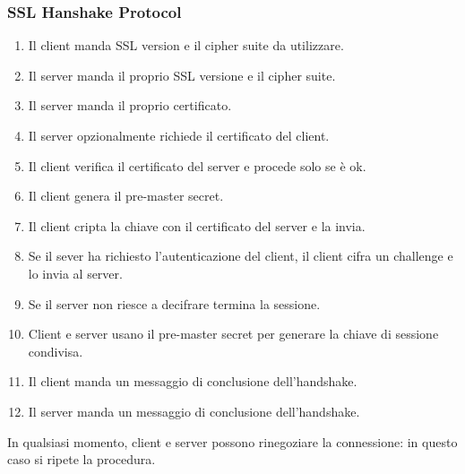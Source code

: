         \subsubsection{SSL Hanshake Protocol}
            \begin{enumerate}
                \item Il client manda SSL version e il cipher suite da utilizzare.
                \item Il server manda il proprio SSL versione e il cipher suite.
                \item Il server manda il proprio certificato.
                \item Il server opzionalmente richiede il certificato del client.
                \item Il client verifica il certificato del server e procede solo se è ok.
                \item Il client genera il pre-master secret.
                \item Il client cripta la chiave con il certificato del server e la invia.
                \item Se il sever ha richiesto l'autenticazione del client, il client cifra un challenge e lo invia al server.
                \item Se il server non riesce a decifrare termina la sessione.
                \item Client e server usano il pre-master secret per generare la chiave di
                sessione condivisa.
                \item Il client manda un messaggio di conclusione dell'handshake.
                \item Il server manda un messaggio di conclusione dell'handshake.                
            \end{enumerate}

            In qualsiasi momento, client e server possono rinegoziare la connessione: in questo caso si ripete la procedura.

